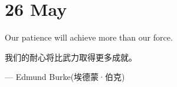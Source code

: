 \section{26 May}
Our patience will achieve more than our force.

我们的耐心将比武力取得更多成就。\par
\hfill --- Edmund Burke(埃德蒙·伯克)\par
